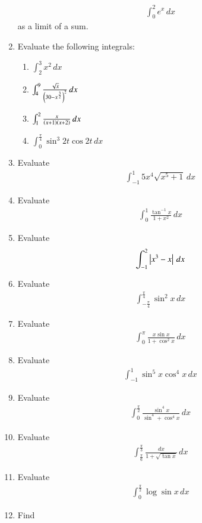 \begin{enumerate}[label=\arabic*.,ref=\thesubsection.\theenumi]
\begin{align}
\int_{0}^{2} e^x\,dx
\end{align}
%
as a limit of a sum.
%
\item Evaluate the following integrals:
\begin{enumerate}
%
\item  $\int_{2}^{3}x^2 \,dx$
\item  $\int_{4}^{9}\frac{\sqrt{x}}{\left(30-x^{\frac{3}{2}}\right)^2}\,dx$
\item  $\int_{1}^{2}\frac{x}{\left(x+1\right)\left(x+2\right)}\,dx$
\item  $\int_{0}^{\frac{\pi}{4}}\sin^3 2t \cos 2t\,dx$
%
\end{enumerate}
%
\item Evaluate
\begin{align}
\int_{-1}^{1} 5x^4\sqrt{x^5+1}\,dx
\end{align}
%
\item Evaluate
\begin{align}
\int_{0}^{1} \frac{\tan ^{-1}x}{1+x^2}\,dx
\end{align}
%
\item Evaluate
\begin{align}
\int_{-1}^{2} \left\vert x^3-x\right\vert\,dx
\end{align}
%
\item Evaluate
\begin{align}
\int_{-\frac{\pi}{4}}^{\frac{\pi}{4}}\sin^2 x\,dx
\end{align}
%
\item Evaluate
\begin{align}
\int_{0}^{\pi}\frac{x\sin x}{1+\cos^2 x}\,dx
\end{align}
%
\item Evaluate
\begin{align}
\int_{-1}^{1}\sin^5 x \cos^{4} x\,dx
\end{align}
%
\item Evaluate
\begin{align}
\int_{0}^{\frac{\pi}{2}}\frac{\sin^4 x}{\sin^4+\cos^4 x}\,dx
\end{align}
%
\item Evaluate
\begin{align}
\int_{\frac{\pi}{6}}^{\frac{\pi}{3}}\frac{dx}{1+\sqrt{\tan x}}\,dx
\end{align}
%
\item Evaluate
\begin{align}
\int_{0}^{\frac{\pi}{2}}\log \sin x \,dx
\end{align}
%
\item Find

\end{enumerate}
